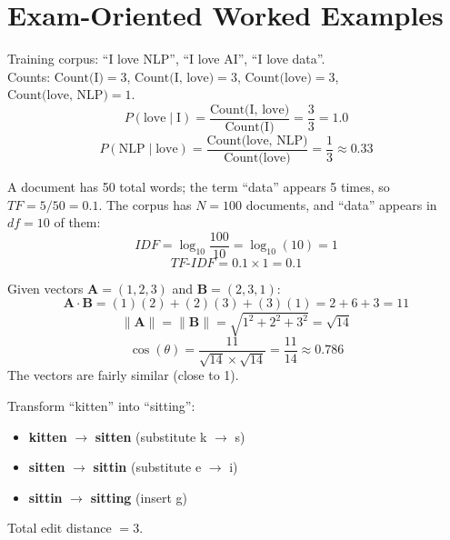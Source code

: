 \documentclass[11pt,a4paper]{article}
\begin{document}
\section{Exam-Oriented Worked Examples}

\begin{examplebox}
Training corpus: ``I love NLP'', ``I love AI'', ``I love data''.\\
Counts: $\text{Count(I)}=3$, $\text{Count(I, love)}=3$, $\text{Count(love)}=3$, $\text{Count(love, NLP)}=1$.
$$
P(\text{love}\mid \text{I}) = \frac{\text{Count(I, love)}}{\text{Count(I)}} = \frac{3}{3} = 1.0
$$
$$
P(\text{NLP}\mid \text{love}) = \frac{\text{Count(love, NLP)}}{\text{Count(love)}} = \frac{1}{3} \approx 0.33
$$
\end{examplebox}

\begin{examplebox}
A document has 50 total words; the term ``data'' appears 5 times, so $TF=5/50=0.1$. The corpus has $N=100$ documents, and ``data'' appears in $df=10$ of them:
$$
IDF = \log_{10}\frac{100}{10} = \log_{10}(10) = 1
$$
$$
TF\text{-}IDF = 0.1 \times 1 = 0.1
$$
\end{examplebox}

\begin{examplebox}
Given vectors $\mathbf{A}=(1,2,3)$ and $\mathbf{B}=(2,3,1)$:
$$
\mathbf{A}\cdot\mathbf{B} = (1)(2)+(2)(3)+(3)(1) = 2+6+3 = 11
$$
$$
\lVert \mathbf{A}\rVert = \lVert \mathbf{B}\rVert = \sqrt{1^2+2^2+3^2}=\sqrt{14}
$$
$$
\cos(\theta) = \frac{11}{\sqrt{14}\times\sqrt{14}} = \frac{11}{14} \approx 0.786
$$
The vectors are fairly similar (close to 1).
\end{examplebox}

\begin{examplebox}
Transform ``kitten'' into ``sitting'':
\begin{itemize}[leftmargin=*]
  \item \textbf{kitten} $\to$ \textbf{sitten} (substitute k $\to$ s)
  \item \textbf{sitten} $\to$ \textbf{sittin} (substitute e $\to$ i)
  \item \textbf{sittin} $\to$ \textbf{sitting} (insert g)
\end{itemize}
Total edit distance $=3$.
\end{examplebox}
\end{document}
